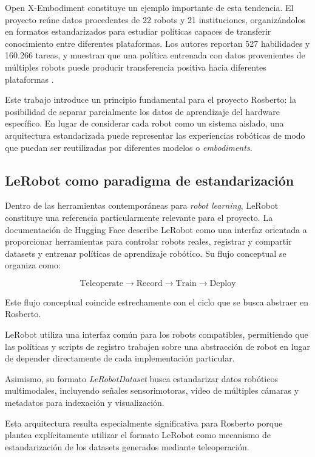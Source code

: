 \documentclass[stu,12pt,floatsintext]{apa7}
\begin{document}
Open X-Embodiment constituye un ejemplo importante de esta tendencia. El proyecto reúne datos procedentes de 22 robots y 21 instituciones, organizándolos en formatos estandarizados para estudiar políticas capaces de transferir conocimiento entre diferentes plataformas. Los autores reportan 527 habilidades y 160.266 tareas, y muestran que una política entrenada con datos provenientes de múltiples robots puede producir transferencia positiva hacia diferentes plataformas \parencite{fang2023rh20tcomprehensiveroboticdataset}.

Este trabajo introduce un principio fundamental para el proyecto Rosberto: la posibilidad de separar parcialmente los datos de aprendizaje del hardware específico. En lugar de considerar cada robot como un sistema aislado, una arquitectura estandarizada puede representar las experiencias robóticas de modo que puedan ser reutilizadas por diferentes modelos o \textit{embodiments}.

\subsection{LeRobot como paradigma de estandarización}

Dentro de las herramientas contemporáneas para \textit{robot learning}, LeRobot constituye una referencia particularmente relevante para el proyecto. La documentación de Hugging Face describe LeRobot como una interfaz orientada a proporcionar herramientas para controlar robots reales, registrar y compartir datasets y entrenar políticas de aprendizaje robótico. Su flujo conceptual se organiza como:

\begin{equation}
\text{Teleoperate}
\rightarrow
\text{Record}
\rightarrow
\text{Train}
\rightarrow
\text{Deploy}
\end{equation}

Este flujo conceptual coincide estrechamente con el ciclo que se busca abstraer en Rosberto.

LeRobot utiliza una interfaz común para los robots compatibles, permitiendo que las políticas y scripts de registro trabajen sobre una abstracción de robot en lugar de depender directamente de cada implementación particular.

Asimismo, su formato \textit{LeRobotDataset} busca estandarizar datos robóticos multimodales, incluyendo señales sensorimotoras, vídeo de múltiples cámaras y metadatos para indexación y visualización.

Esta arquitectura resulta especialmente significativa para Rosberto porque plantea explícitamente utilizar el formato LeRobot como mecanismo de estandarización de los datasets generados mediante teleoperación.
\end{document}

